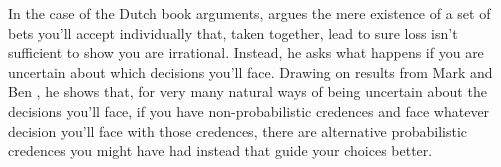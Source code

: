 \documentclass[a4paper]{article}
\newcommand{\todoinfo}[2][]{\todo[backgroundcolor=orange!80,bordercolor=black,linecolor=gray!80, #1,inline,caption={}]{#2}}
\renewcommand{\color}[1]{}
\newenvironment{CCM rewritten}
{\begingroup\color{blue}} %
{\endgroup}              %
\begin{document}
{In the case of the Dutch book arguments,  argues the mere existence of a set of bets you'll accept individually that, taken together, lead to sure loss isn't sufficient to show you are  irrational. Instead, he asks what happens if you are uncertain about which decisions you'll face. Drawing on results from Mark \citet{schervish1989gm} and Ben \citet{levinstein2017pgeu}, he shows that, for very  many natural ways of being uncertain about the decisions you'll face, if you have non-probabilistic credences and face whatever decision you'll face with those credences, there are alternative probabilistic credences you might have had instead that guide your choices better.




}


%
%
%
%
%
%
%
%
%
%
%
%
%
%
%
%
\end{document}
